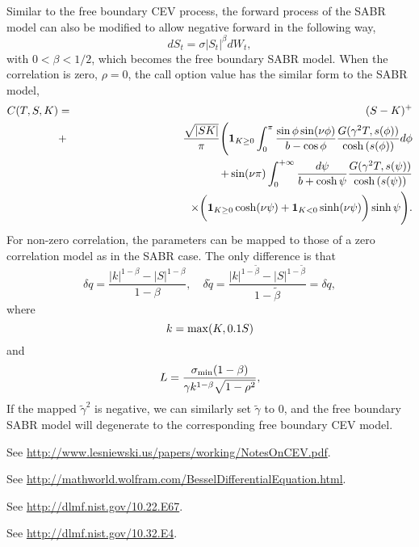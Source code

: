 \documentclass[12pt]{article}
\begin{document}
  Similar to the free boundary CEV process, the forward process of the SABR model can also be modified to allow negative
  forward in the following way,
  \begin{equation}
    dS_t=\sigma \left|S_t\right|^{\beta}dW_t,
    \label{FreeBoundarySABR}
  \end{equation}
  with $0<\beta<1/2$, which becomes the free boundary SABR model. When the correlation is zero, $\rho=0$, the call option
  value has the similar form to the SABR model,
  \begin{eqnarray}
    C(T,S,K) &=& (S-K)^+ \nonumber\\
             &+&\frac{\sqrt{\left|SK\right|}}{\pi}\Bigg({\bf 1}_{K\geq 0}\int_0^{\pi}\frac{\sin\phi\sin(\nu\phi)}{b-\cos\phi}
                        \frac{G(\gamma^2T,s(\phi))}{\cosh\left(s(\phi)\right)}d\phi\nonumber\\
             &&\quad\quad\quad\quad\quad + \sin(\nu\pi)\int_0^{+\infty}
                \frac{d\psi}{b+\cosh \psi}
       \frac{G(\gamma^2T,s(\psi))}{\cosh\left(s(\psi)\right)}\nonumber\\
             &&\quad\quad\quad\quad\quad\quad\quad\quad\quad\quad \times
                  \bigg({\bf 1}_{K\geq 0}\cosh(\nu \psi)+{\bf 1}_{K< 0}\sinh(\nu \psi)\bigg)\sinh \psi\Bigg).
  \end{eqnarray}
  For non-zero correlation, the parameters can be mapped to those of a zero correlation model as in the SABR case. The only difference is
  that
  \begin{equation}
      \delta q = \frac{|k|^{1-\beta}-|S|^{1-\beta}}{1-\beta},\quad
      \delta \tilde{q} = \frac{|k|^{1-\tilde{\beta}}-|S|^{1-\tilde{\beta}}}{1-\tilde{\beta}} = \delta q,
  \end{equation}
  where
  \begin{equation}
    k={\rm max}(K,0.1S)
  \end{equation}
  and
  \begin{equation}
    L=\frac{\sigma_{{\rm min}}(1-\beta)}{\gamma k^{1-\beta}\sqrt{1-\rho^2}},
  \end{equation}
  If the mapped $\tilde{\gamma}^2$ is negative, we can similarly set $\tilde{\gamma}$ to 0, and the free boundary SABR model
  will degenerate to the corresponding free boundary CEV model.



\begin{thebibliography}{99}
    See \url{http://www.lesniewski.us/papers/working/NotesOnCEV.pdf}.

    See \url{http://mathworld.wolfram.com/BesselDifferentialEquation.html}.

    See \url{http://dlmf.nist.gov/10.22.E67}.

    See \url{http://dlmf.nist.gov/10.32.E4}.
\end{thebibliography}
\end{document}
